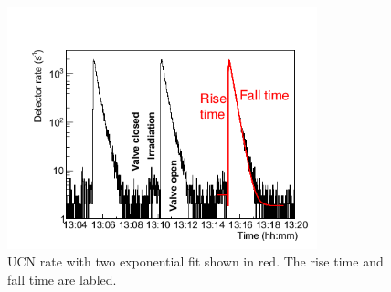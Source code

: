 \begin{figure}[h!]
  \centering
  \includegraphics[width=0.8\textwidth]{risefalltime.png}
  \caption{UCN rate with two exponential fit shown in red. The rise
    time and fall time are labled.}
  \label{fig:risefalltime}
\end{figure}



